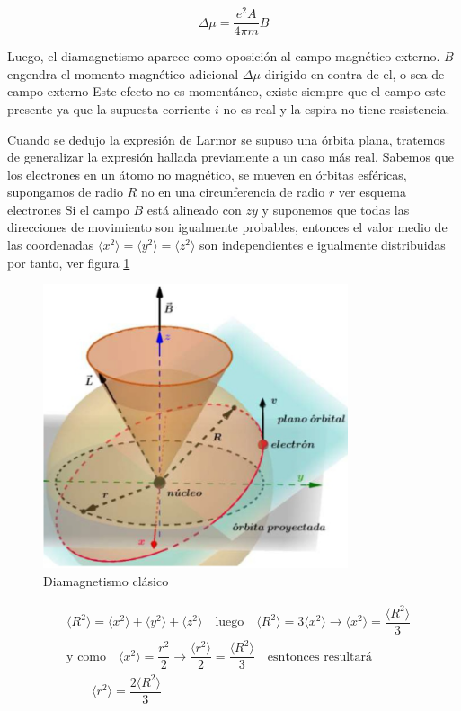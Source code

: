 \begin{equation*}
	\Delta\mu=\dfrac{e^{2}A}{4\pi m}B
\end{equation*}

Luego, el diamagnetismo aparece como oposición al campo magnético externo. $B$ engendra el momento magnético adicional $\Delta\mu$ dirigido en contra de el, o sea de campo externo Este efecto no es momentáneo, existe siempre que el campo este presente ya que la supuesta corriente $i$ no es real y la espira no tiene resistencia.

Cuando se dedujo la expresión de Larmor se supuso una órbita plana, tratemos de generalizar la expresión hallada previamente a un caso más real. Sabemos que los electrones en un átomo no magnético, se mueven en órbitas esféricas, supongamos de radio $R$ no en una circunferencia de radio $r$ ver esquema electrones Si el campo $B$ está alineado con $zy$ y suponemos que todas las direcciones de movimiento son igualmente probables, entonces el valor medio de las coordenadas $\langle x^{2}\rangle=\langle y^{2} \rangle =\langle z^{2} \rangle$ son independientes e igualmente distribuidas por tanto, ver figura \ref{fig:s17}


\begin{figure}[H]
    \centering
    \includegraphics[width=0.8\textwidth]{./Figures/fig_s17}
	\caption{Diamagnetismo clásico}
	\label{fig:s17}
\end{figure}

\begin{equation}
\begin{aligned}
&\langle R^{2} \rangle = \langle x^{2}\rangle + \langle y^{2} \rangle + \langle z^{2} \rangle \quad \text{luego} \quad \langle R^{2} \rangle = 3\langle x^{2}\rangle\rightarrow \langle x^{2} \rangle = \dfrac{\langle R^{2}\rangle}{3} \\
& \text{y como} \quad \langle x^{2}\rangle = \dfrac{r^{2}}{2} \rightarrow \dfrac{\langle r^{2} \rangle}{2}=\dfrac{\langle R^{2} \rangle}{3} \quad \text{esntonces resultará}\\
& \qquad \langle r^{2} \rangle= \dfrac{2\langle R^{2} \rangle}{3}
\end{aligned}
\end{equation}

